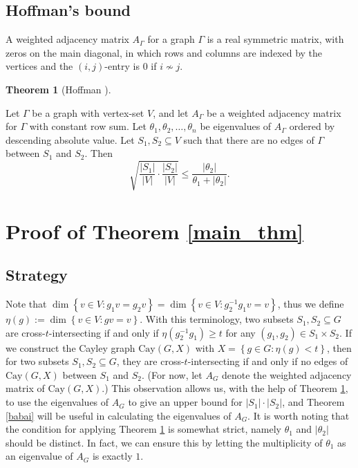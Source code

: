 \documentclass[12pt, reqno]{amsart}
\theoremstyle{definition}
\newtheorem{theorem}{Theorem}[section]
\theoremstyle{remark}
\numberwithin{equation}{section}
\newcommand{\gs}{\geqslant}
\newcommand{\ls}{\leqslant}
\newcommand{\cb}[1]{\left\{#1\right\}}
\newcommand{\abs}[1]{\left|#1\right|}
\newcommand{\Cay}{\mathrm{Cay}}
\begin{document}
\subsection{Hoffman’s bound}

A weighted adjacency matrix $A_\Gamma$ for a graph $\Gamma$ is a real symmetric matrix, with zeros on the main diagonal, in which rows and columns are indexed by the vertices and the $(i, j)$-entry is $0$ if $i\not\sim j$.

\begin{theorem}[Hoffman \cite{MR284373}]\label{Hoffman}
	
	Let $\Gamma$ be a graph with vertex-set $V$, and let $A_\Gamma$ be a weighted adjacency matrix for $\Gamma$ with constant row sum. Let $\theta_1, \theta_2, \ldots, \theta_n$ be eigenvalues of $A_\Gamma$ ordered by descending absolute value. Let $S_1, S_2 \subseteq V$ such that there are no edges of $\Gamma$ between $S_1$ and $S_2$. Then
	\[\sqrt{\frac{\abs{S_1}}{\abs{V}}\cdot\frac{\abs{S_2}}{\abs{V}}} \ls \frac{\abs{\theta_2}}{\theta_1 + \abs{\theta_2}}.\]
	
\end{theorem}

\newpage
\section{Proof of Theorem \ref{main_thm}}\label{Proof}

\subsection{Strategy}

Note that $\dim\cb{v \in V: g_1v = g_2v} = \dim\cb{v \in V: g_2^{-1}g_1v = v}$, thus we define $\eta(g) := \dim\cb{v \in V: gv = v}$. With this terminology, two subsets $S_1, S_2 \subseteq G$ are cross-$t$-intersecting if and only if $\eta(g_2^{-1}g_1) \gs t$ for any $(g_1, g_2) \in S_1 \times S_2$. If we construct the Cayley graph $\Cay(G, X)$ with $X = \cb{g \in G: \eta(g) < t}$, then for two subsets $S_1, S_2 \subseteq G$, they are cross-$t$-intersecting if and only if no edges of $\Cay(G, X)$ between $S_1$ and $S_2$. (For now, let $A_G$ denote the weighted adjacency matrix of $\Cay(G, X)$.) This observation allows us, with the help of Theorem \ref{Hoffman}, to use the eigenvalues of $A_G$ to give an upper bound for $\abs{S_1}\cdot\abs{S_2}$, and Theorem \ref{babai} will be useful in calculating the eigenvalues of $A_G$. It is worth noting that the condition for applying Theorem \ref{Hoffman} is somewhat strict, namely $\theta_1$ and $\abs{\theta_2}$ should be distinct. In fact, we can ensure this by letting the multiplicity of $\theta_1$ as an eigenvalue of $A_G$ is exactly $1$.
\end{document}
